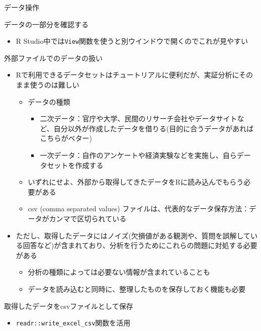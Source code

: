 \documentclass[
  ignorenonframetext,
]{beamer}
\providecommand{\tightlist}{%
  \setlength{\itemsep}{0pt}\setlength{\parskip}{0pt}}
\begin{document}
\begin{frame}[fragile]{データ操作}
\begin{block}{データの一部分を確認する}
\begin{itemize}
\tightlist
\item
  R
  Studio中では\texttt{View}関数を使うと別ウインドウで開くのでこれが見やすい
\end{itemize}
\end{block}

\begin{block}{外部ファイルでのデータの扱い}
\protect\hypertarget{ux5916ux90e8ux30d5ux30a1ux30a4ux30ebux3067ux306eux30c7ux30fcux30bfux306eux6271ux3044}{}
\begin{itemize}
\tightlist
\item
  Rで利用できるデータセットはチュートリアルに便利だが、実証分析にそのまま使うのは難しい

  \begin{itemize}
  \tightlist
  \item
    データの種類

    \begin{itemize}
    \tightlist
    \item
      二次データ：官庁や大学、民間のリサーチ会社やデータサイトなど、自分以外が作成したデータを借りる(目的に合うデータがあればこちらがベター)
    \item
      一次データ：自作のアンケートや経済実験などを実施し、自らデータセットを作成する
    \end{itemize}
  \item
    いずれにせよ、外部から取得してきたデータをRに読み込んでもらう必要がある
  \item
    csv (comma separated values)
    ファイルは、代表的なデータ保存方法：データがカンマで区切られている
  \end{itemize}
\item
  ただし、取得したデータにはノイズ(欠損値がある観測や、質問を誤解している回答など)が含まれており、分析を行うためにこれらの問題に対処する必要がある

  \begin{itemize}
  \tightlist
  \item
    分析の種類によっては必要ない情報が含まれていることも
  \item
    データを読み込むと同時に、整理したものを保存しておく機能も必要
  \end{itemize}
\end{itemize}
\end{block}

\begin{block}{取得したデータをcsvファイルとして保存}
\protect\hypertarget{ux53d6ux5f97ux3057ux305fux30c7ux30fcux30bfux3092csvux30d5ux30a1ux30a4ux30ebux3068ux3057ux3066ux4fddux5b58}{}
\begin{itemize}
\tightlist
\item
  \texttt{readr::write\_excel\_csv}関数を活用


\end{itemize}
\end{block}
\end{frame}
\end{document}
